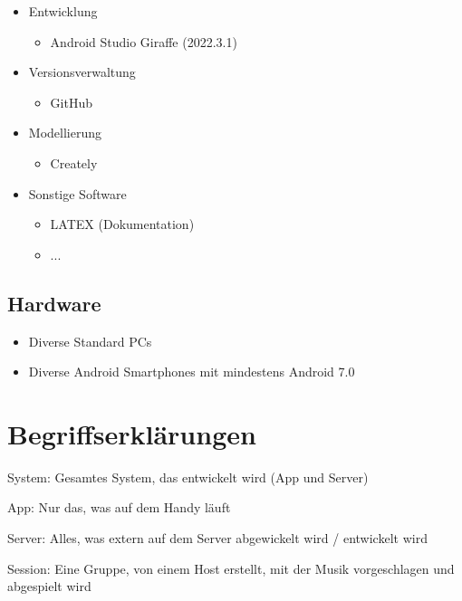 \documentclass[oneside, ngerman]{sdqtechreport}
\begin{document}
\begin{itemize}
    \item Entwicklung
    \begin{itemize}
        \item Android Studio Giraffe (2022.3.1)
    \end{itemize}
    
    \item Versionsverwaltung
    \begin{itemize}
        \item GitHub
    \end{itemize}

    \item Modellierung
    \begin{itemize}
        \item Creately
    \end{itemize}

    \item Sonstige Software
    \begin{itemize}
        \item LATEX (Dokumentation)
        \item ...
    \end{itemize}
    
\end{itemize}

\section{Hardware}
\label{sec:Entwicklungsumgebung:Hardware}

\begin{itemize}
    \item Diverse Standard PCs
    \item Diverse Android Smartphones mit mindestens Android 7.0
\end{itemize}


\chapter{Begriffserklärungen}
\label{chap:Begriffserklärungen}

System: Gesamtes System, das entwickelt wird (App und Server)

App: Nur das, was auf dem Handy läuft

Server: Alles, was extern auf dem Server abgewickelt wird / entwickelt wird

Session: Eine Gruppe, von einem Host erstellt, mit der Musik vorgeschlagen und abgespielt wird
\end{document}
